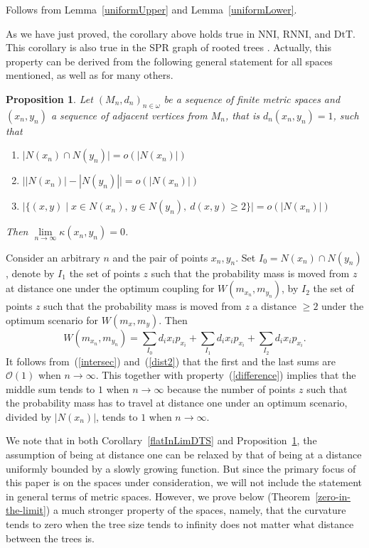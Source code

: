 \documentclass[11pt]{amsart}
\newtheorem{proposition}[lemma]{Proposition}
\theoremstyle{definition}
\newcommand{\nni}{\mathrm{NNI}}
\newcommand{\rnni}{\mathrm{RNNI}}
\newcommand{\dtt}{\mathrm{DtT}}
\renewcommand{\O}{\mathcal{O}}
\begin{document}
{\proof
Follows from Lemma~\ref{uniformUpper} and Lemma~\ref{uniformLower}.
\endproof

As we have just proved, the corollary above holds true in $\nni$, $\rnni$, and $\dtt$.
This corollary is also true in the SPR graph of rooted trees \autocite{Whidden2015-es}.
Actually, this property can be derived from the following general statement for all spaces mentioned, as well as for many others.

\begin{proposition}
\label{flatInLimGen}
Let $(M_n,d_n)_{n \in \omega}$ be a sequence of finite metric spaces and $(x_n, y_n)$ a sequence of adjacent vertices from $M_n$, that is $d_n(x_n,y_n) = 1$, such that
\begin{enumerate}[(1)]
\item
\label{intersec}
$\big|N(x_n) \cap N(y_n)\big| = o(|N(x_n)|)$
\item
\label{difference}
$\big||N(x_n)| - |N(y_n)|\big| = o(|N(x_n)|)$
\item
\label{dist2}
$\big|\{(x,y) \mid
	x \in N(x_n),~ y \in N(y_n),~ d(x, y) \geq 2\}\big| = o(|N(x_n)|)$
\end{enumerate}

Then $\lim\limits_{n \to \infty} \kappa(x_n, y_n) = 0$.
\end{proposition}

\proof
Consider an arbitrary $n$ and the pair of points $x_n,y_n$.
Set $I_0 = N(x_n) \cap N(y_n)$, denote by $I_1$ the set of points $z$ such that the probability mass is moved from $z$ at distance one under the optimum coupling for $W(m_{x_n},m_{y_n})$, by $I_2$ the set of points $z$ such that the probability mass is moved from $z$ a distance $\geq 2$ under the optimum scenario for $W(m_x,m_y)$.
Then
\[
W(m_{x_n},m_{y_n}) = \sum_{I_0} d_i x_i p_{x_i} + \sum_{I_1} d_i x_i p_{x_i} +
\sum_{I_2} d_i x_i p_{x_i}.
\]
It follows from~(\ref{intersec}) and~(\ref{dist2}) that the first and the last sums are $\O(1)$ when $n\to\infty$.
This together with property~(\ref{difference}) implies that the middle sum tends to $1$ when $n\to\infty$ because the number of points $z$ such that the probability mass has to travel at distance one under an optimum scenario, divided by $|N(x_n)|$, tends to $1$ when $n\to\infty$.
\endproof

We note that in both Corollary~\ref{flatInLimDTS} and Proposition~\ref{flatInLimGen}, the assumption of being at distance one can be relaxed by that of being at a distance uniformly bounded by a slowly growing function.
But since the primary focus of this paper is on the spaces under consideration, we will not  include the statement in general terms of metric spaces.
However, we prove below (Theorem~\ref{zero-in-the-limit}) a much stronger property of the spaces, namely, that the curvature tends to zero when the tree size tends to infinity does not matter what distance between the trees is.
}
{}
\end{document}

